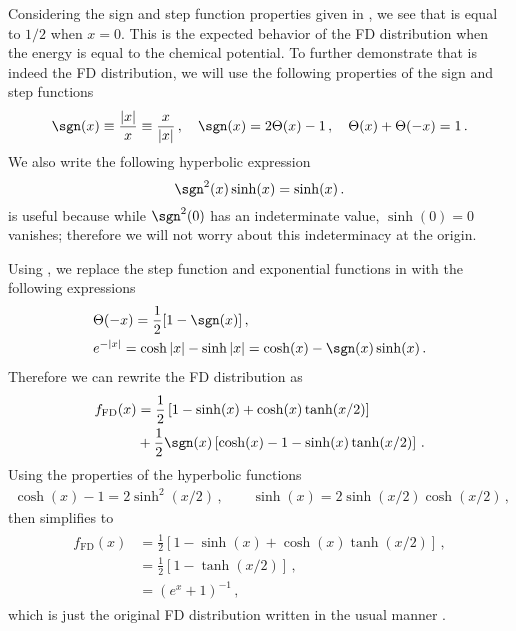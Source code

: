 Considering the sign and step function properties given in , we see that  is equal to $1/2$ when $x=0$. This is the expected behavior of the FD distribution when the energy is equal to the chemical potential. To further demonstrate that  is indeed the FD distribution, we will use the following properties of the sign and step functions
\begin{align}
\label{NFF2a}
\sgn(x)\equiv\frac{|x|}{x}\equiv\frac{x}{|x|}\,,\quad
\sgn(x)=2\Theta(x)-1\,,\quad
\Theta(x)+\Theta(-x)=1\,.
\end{align}
We also write the following hyperbolic expression
\begin{equation}
\label{NFFa1}
\sgn^{2}(x)\sinh(x)=\sinh(x)\,.
\end{equation}
 is useful because while $\sgn^{2}(0)$ has an indeterminate value, $\sinh(0)=0$ vanishes; therefore we will not worry about this indeterminacy at the origin.

Using , we replace the step function and exponential functions in  with the following expressions
\begin{align}
\label{NFF4}
&\Theta(-x)=\frac 1 2 [1-\sgn(x)]\,,\\ 
&e^{-|x|}=\cosh|x|-\sinh|x|=\cosh(x)- \sgn(x)\sinh(x)\,.
\end{align}
Therefore we can rewrite the FD distribution  as
\begin{align}
\begin{split}
\label{NFF4a}
f_\mathrm{FD}(x)&=\frac{1}{2}\left[1-\sinh(x)+\cosh(x)\tanh(x/2)\right]\\
&+\frac{1}{2}\sgn(x)\left[\cosh(x)-1-\sinh(x)\tanh(x/2)\right]\,.
\end{split}
\end{align}
Using the properties of the hyperbolic functions
\begin{align}
\cosh(x)-1=2\sinh^2(x/2)\,,\qquad
\sinh(x)=2\sinh(x/2)\cosh(x/2)\,,
\end{align}
 then simplifies to
\begin{align}
\begin{split}
\label{NFF4b}
f_\mathrm{FD}(x)
&=\frac{1}{2}\left[1-\sinh(x)+\cosh(x)\tanh(x/2)\right]\,,\\
&=\frac{1}{2}\left[1-\tanh(x/2)\right]\,,\\
&=\left(e^{x}+1\right)^{-1}\,,
\end{split}
\end{align}
which is just the original FD distribution written in the usual manner .

